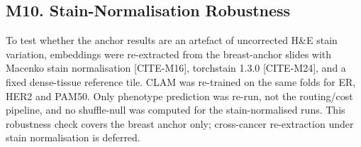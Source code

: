 \subsection*{M10. Stain-Normalisation Robustness}

To test whether the anchor results are an artefact of uncorrected H\&E stain variation, embeddings were re-extracted from the breast-anchor slides with Macenko stain normalisation [CITE-M16], torchstain 1.3.0 [CITE-M24], and a fixed dense-tissue reference tile. CLAM was re-trained on the same folds for ER, HER2 and PAM50. Only phenotype prediction was re-run, not the routing/cost pipeline, and no shuffle-null was computed for the stain-normalised runs. This robustness check covers the breast anchor only; cross-cancer re-extraction under stain normalisation is deferred.


